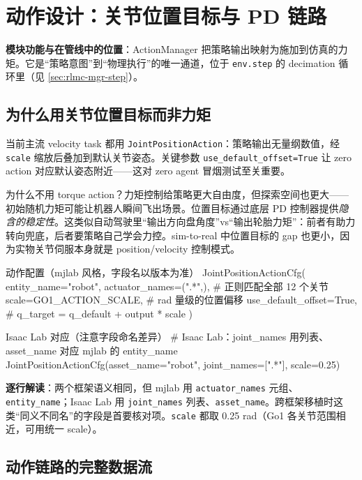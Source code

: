 \section{动作设计：关节位置目标与 PD 链路}
\label{sec:rlmc-ql-action}

\textbf{模块功能与在管线中的位置}：ActionManager 把策略输出映射为施加到仿真的力矩。它是“策略意图”到“物理执行”的唯一通道，位于 \verb|env.step| 的 decimation 循环里（见 \cref{sec:rlmc-mgr-step}）。

\subsection{为什么用关节位置目标而非力矩}
\label{sec:rlmc-ql-action-why}

当前主流 velocity task 都用 \verb|JointPositionAction|：策略输出无量纲数值，经 \verb|scale| 缩放后叠加到默认关节姿态。关键参数 \verb|use_default_offset=True| 让 zero action 对应默认姿态附近——这对 zero agent 冒烟测试至关重要。

为什么不用 torque action？力矩控制给策略更大自由度，但探索空间也更大——初始随机力矩可能让机器人瞬间飞出场景。位置目标通过底层 PD 控制器提供\emph{隐含的稳定性}。这类似自动驾驶里“输出方向盘角度”vs“输出轮胎力矩”：前者有助力转向兜底，后者要策略自己学会力控。sim-to-real 中位置目标的 gap 也更小，因为实物关节伺服本身就是 position/velocity 控制模式。

\begin{codebox}[Python]{动作配置（mjlab 风格，字段名以版本为准）}
JointPositionActionCfg(
    entity_name="robot",
    actuator_names=(".*",),        # 正则匹配全部 12 个关节
    scale=GO1_ACTION_SCALE,         # rad 量级的位置偏移
    use_default_offset=True,        # q_target = q_default + output * scale
)
\end{codebox}

\begin{codebox}[Python]{Isaac Lab 对应（注意字段命名差异）}
# Isaac Lab：joint_names 用列表、asset_name 对应 mjlab 的 entity_name
JointPositionActionCfg(asset_name="robot", joint_names=[".*"], scale=0.25)
\end{codebox}

\textbf{逐行解读}：两个框架语义相同，但 mjlab 用 \verb|actuator_names| 元组、\verb|entity_name|；Isaac Lab 用 \verb|joint_names| 列表、\verb|asset_name|。跨框架移植时这类“同义不同名”的字段是首要核对项。\verb|scale| 都取 0.25 rad（Go1 各关节范围相近，可用统一 scale）。

\subsection{动作链路的完整数据流}
\label{sec:rlmc-ql-action-trace}

